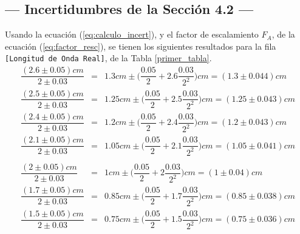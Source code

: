 \documentclass[12pt,a4paper]{article}
\begin{document}
\subsection{--- Incertidumbres de la Sección 4.2 ---} %
\label{incertidumbres_4_2}
Usando la ecuación (\ref{eq:calculo_incert}), y el factor de escalamiento \(F_A\), de la ecuación (\ref{eq:factor_resc}), se tienen los siguientes resultados para la fila \texttt{[Longitud de Onda Real]}, de la Tabla \ref{primer_tabla}.
\[
	\begin{array}{rcl}
		\dfrac{(2.6 \pm 0.05)cm}{2\pm 0.03} & = & 1.3cm \pm  \Bigg(\dfrac{0.05}{2} + 2.6\dfrac{0.03}{2^2}\Bigg)cm = ( 1.3 \pm 0.044)cm \\[6mm]
		\dfrac{(2.5 \pm 0.05)cm}{2\pm 0.03} & = & 1.25cm \pm \Bigg(\dfrac{0.05}{2} + 2.5\dfrac{0.03}{2^2}\Bigg)cm = (1.25 \pm 0.043)cm \\[6mm]
		\dfrac{(2.4 \pm 0.05)cm}{2\pm 0.03} & = & 1.2cm \pm  \Bigg(\dfrac{0.05}{2} + 2.4\dfrac{0.03}{2^2}\Bigg)cm =  (1.2 \pm 0.043)cm \\[6mm]
		\dfrac{(2.1 \pm 0.05)cm}{2\pm 0.03} & = & 1.05cm \pm \Bigg(\dfrac{0.05}{2} + 2.1\dfrac{0.03}{2^2}\Bigg)cm = (1.05 \pm 0.041)cm \\[6mm]
	\end{array}
\]
\[
	\begin{array}{rcl}
		\dfrac{(2 \pm 0.05)cm}{2\pm 0.03} & = & 1cm \pm    \Bigg(\dfrac{0.05}{2}   + 2  \dfrac{0.03}{2^2}\Bigg)cm =    (1 \pm 0.04)cm \\[6mm]
		\dfrac{(1.7 \pm 0.05)cm}{2\pm 0.03} & = & 0.85cm \pm \Bigg(\dfrac{0.05}{2} + 1.7\dfrac{0.03}{2^2}\Bigg)cm = (0.85 \pm 0.038)cm \\[6mm]
		\dfrac{(1.5 \pm 0.05)cm}{2\pm 0.03} & = & 0.75cm \pm \Bigg(\dfrac{0.05}{2} + 1.5\dfrac{0.03}{2^2}\Bigg)cm = (0.75 \pm 0.036)cm
	\end{array}
\]
\end{document}
